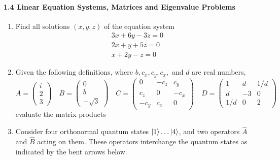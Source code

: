 \documentclass{chem6155problemset}
\begin{document}
\paragraph{1.4 Linear Equation Systems, Matrices and Eigenvalue Problems}

\begin{enumerate}[resume]
	\item Find all solutions $(x,y,z)$ of the equation system
	\[ \begin{array}{ccc} 3 x + 6 y -3 z = 0 \\
	   					  2 x +   y + 5z = 0 \\
						  x   +  2y - z  = 0
       \end{array}
       \]


  \item Given the following definitions, where $b, c_x, c_y, c_x,$ and $d$ are real numbers,
  \[  A=\begin{pmatrix} i \\ 2 \\ 3 \end{pmatrix}  \quad
      B=\begin{pmatrix} 0 \\ b \\ -\sqrt{3} \end{pmatrix} \quad
      C=\begin{pmatrix} 0  & -c_z &  c_y \\ c_z & 0 & -c_x \\ -c_y & c_x & 0 \end{pmatrix} \quad
      D=\begin{pmatrix} 1  & d &  1/d \\ d & -3 & 0 \\  1/d & 0 & 2 \end{pmatrix}
  \]
  evaluate the matrix products
	\item Consider four orthonormal quantum states $ \dots {}$, and two operators $\hat A$ and $\hat B$ acting on them. These operators interchange the quantum states as indicated by the bent arrows below.


\end{enumerate}
\end{document}
